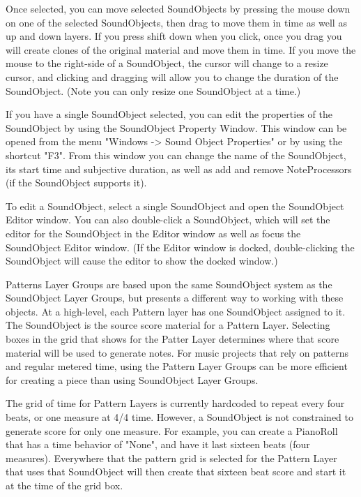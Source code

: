 Once selected, you can move selected SoundObjects by pressing the mouse
down on one of the selected SoundObjects, then drag to move them in time
as well as up and down layers. If you press shift down when you click,
once you drag you will create clones of the original material and move
them in time. If you move the mouse to the right-side of a SoundObject,
the cursor will change to a resize cursor, and clicking and dragging
will allow you to change the duration of the SoundObject. (Note you can
only resize one SoundObject at a time.)

If you have a single SoundObject selected, you can edit the properties
of the SoundObject by using the SoundObject Property Window. This window
can be opened from the menu "Windows -\textgreater{} Sound Object
Properties" or by using the shortcut "F3". From this window you can
change the name of the SoundObject, its start time and subjective
duration, as well as add and remove NoteProcessors (if the SoundObject
supports it).

To edit a SoundObject, select a single SoundObject and open the
SoundObject Editor window. You can also double-click a SoundObject,
which will set the editor for the SoundObject in the Editor window as
well as focus the SoundObject Editor window. (If the Editor window is
docked, double-clicking the SoundObject will cause the editor to show
the docked window.)

Patterns Layer Groups are based upon the same SoundObject system as the
SoundObject Layer Groups, but presents a different way to working with
these objects. At a high-level, each Pattern layer has one SoundObject
assigned to it. The SoundObject is the source score material for a
Pattern Layer. Selecting boxes in the grid that shows for the Patter
Layer determines where that score material will be used to generate
notes. For music projects that rely on patterns and regular metered
time, using the Pattern Layer Groups can be more efficient for creating
a piece than using SoundObject Layer Groups.

The grid of time for Pattern Layers is currently hardcoded to repeat
every four beats, or one measure at 4/4 time. However, a SoundObject is
not constrained to generate score for only one measure. For example, you
can create a PianoRoll that has a time behavior of "None", and have it
last sixteen beats (four measures). Everywhere that the pattern grid is
selected for the Pattern Layer that uses that SoundObject will then
create that sixteen beat score and start it at the time of the grid box.

